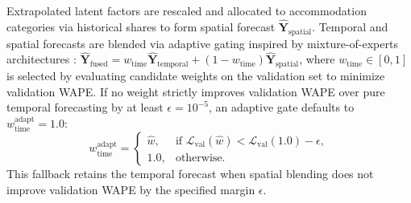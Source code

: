 \documentclass[sigconf]{acmart}
\begin{document}
Extrapolated latent factors are rescaled and allocated to accommodation categories via historical shares to form spatial forecast $\hat{\mathbf{Y}}_{\text{spatial}}$. Temporal and spatial forecasts are blended via adaptive gating inspired by mixture-of-experts architectures \cite{jacobs1991adaptive,shazeer2017moe}: $\hat{\mathbf{Y}}_{\text{fused}} = w_{\text{time}} \hat{\mathbf{Y}}_{\text{temporal}} + (1 - w_{\text{time}}) \hat{\mathbf{Y}}_{\text{spatial}}$, where $w_{\text{time}} \in [0, 1]$ is selected by evaluating candidate weights on the validation set to minimize validation WAPE. If no weight strictly improves validation WAPE over pure temporal forecasting by at least $\epsilon=10^{-5}$, an adaptive gate defaults to $w_{\text{time}}^{\text{adapt}}=1.0$:
\begin{equation}
w_{\text{time}}^{\text{adapt}} = \begin{cases}
\hat{w}, & \text{if } \mathcal{L}_{\text{val}}(\hat{w}) < \mathcal{L}_{\text{val}}(1.0) - \epsilon, \\
1.0, & \text{otherwise}.
\end{cases}
\label{eq:adaptive_fallback}
\end{equation}
This fallback retains the temporal forecast when spatial blending does not improve validation WAPE by the specified margin $\epsilon$.
\end{document}
